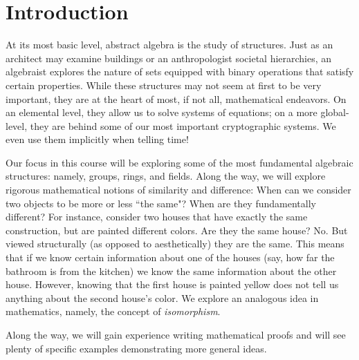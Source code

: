 \chapter*{Introduction}

At its most basic level, abstract algebra is the study of structures.  Just as an architect may examine buildings or an anthropologist societal hierarchies, an algebraist explores the nature of sets equipped with binary operations that satisfy certain properties.  While these structures may not seem at first to be very important, they are at the heart of most, if not all, mathematical endeavors.  On an elemental level, they allow us to solve systems of equations; on a more global-level, they are behind some of our most important cryptographic systems.  We even use them implicitly when telling time!

Our focus in this course will be exploring some of the most fundamental algebraic structures: namely, groups, rings, and fields.  Along the way, we will explore rigorous mathematical notions of similarity and difference: When can we consider two objects to be more or less ``the same"?  When are they fundamentally different?  For instance, consider two houses that have exactly the same construction, but are painted different colors.  Are they the same house?  No.  But viewed structurally (as opposed to aesthetically) they are the same.  This means that if we know certain information about one of the houses (say, how far the bathroom is from the kitchen) we know the same information about the other house.  However, knowing that the first house is painted yellow does not tell us anything about the second house's color.  We explore an analogous idea in mathematics, namely, the concept of \textit{isomorphism}.

Along the way, we will gain experience writing mathematical proofs and will see plenty of specific examples demonstrating more general ideas. 